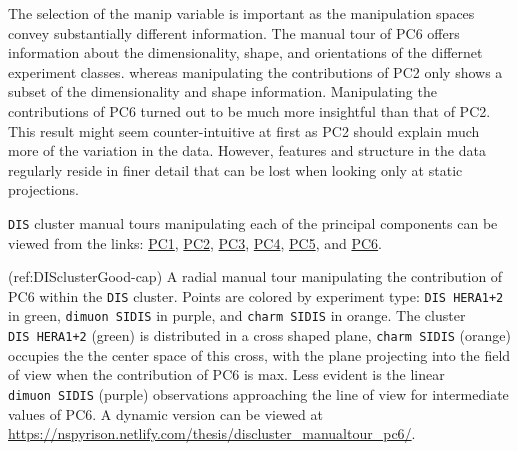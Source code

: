 The selection of the manip variable is important as the manipulation spaces convey substantially different information. The manual tour of PC6 offers information about the dimensionality, shape, and orientations of the differnet experiment classes. whereas manipulating the contributions of PC2 only shows a subset of the dimensionality and shape information. Manipulating the contributions of PC6 turned out to be much more insightful than that of PC2. This result might seem counter-intuitive at first as PC2 should explain much more of the variation in the data. However, features and structure in the data regularly reside in finer detail that can be lost when looking only at static projections.

\texttt{DIS} cluster manual tours manipulating each of the principal components can be viewed from the links: \href{https://nspyrison.netlify.com/thesis/discluster_manualtour_pc1/}{PC1}, \href{https://nspyrison.netlify.com/thesis/discluster_manualtour_pc2/}{PC2}, \href{https://nspyrison.netlify.com/thesis/discluster_manualtour_pc3/}{PC3}, \href{https://nspyrison.netlify.com/thesis/discluster_manualtour_pc4/}{PC4}, \href{https://nspyrison.netlify.com/thesis/discluster_manualtour_pc5/}{PC5}, and \href{https://nspyrison.netlify.com/thesis/discluster_manualtour_pc6/}{PC6}.

(ref:DISclusterGood-cap) A radial manual tour manipulating the contribution of PC6 within the \texttt{DIS} cluster. Points are colored by experiment type: \texttt{DIS\ HERA1+2} in green, \texttt{dimuon\ SIDIS} in purple, and \texttt{charm\ SIDIS} in orange. The cluster \texttt{DIS\ HERA1+2} (green) is distributed in a cross shaped plane, \texttt{charm\ SIDIS} (orange) occupies the the center space of this cross, with the plane projecting into the field of view when the contribution of PC6 is max. Less evident is the linear \texttt{dimuon\ SIDIS} (purple) observations approaching the line of view for intermediate values of PC6. A dynamic version can be viewed at \url{https://nspyrison.netlify.com/thesis/discluster_manualtour_pc6/}.


